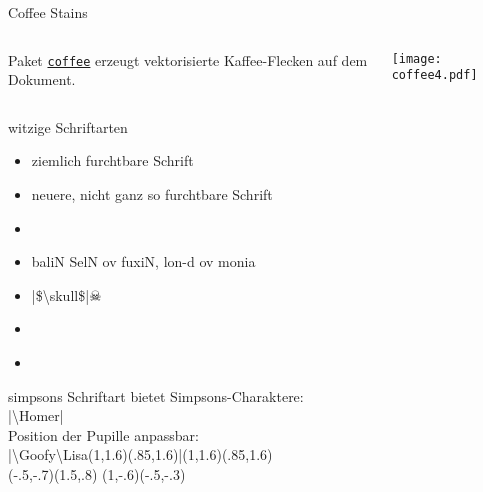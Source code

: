 \documentclass[
	vorläufig=true,
	datum=2016-12-22,
	titel={Witziges und Obskures},
	web=false,
]{../tex/latexkurs-slides}
\begin{document}
\begin{frame}{Coffee Stains}
	\begin{columns}
		\begin{column}{.3\textwidth}
			Paket \alert{\href{http://hanno-rein.de/archives/349}{\texttt{coffee}}} erzeugt vektorisierte Kaffee-Flecken auf dem Dokument.
		\end{column}
		\begin{column}{.6\textwidth}
			\texttt{[image: coffee4.pdf]}
		\end{column}
	\end{columns}
\end{frame}



\begin{frame}{witzige Schriftarten}
	\begin{itemize}[<+->]
		\item {}\hfill{ ziemlich furchtbare Schrift}
		\item {}\hfill{\comicneue neuere, nicht ganz so furchtbare Schrift}
		\item {}%
		\item {}\hfill{\cirth baliN SelN ov fuxiN, lon-d ov monia}
		\vspace{.2ex}

		\item {}\hfill{|\$\textbackslash skull\$|\quad\Large$\skull$}
		\item {}\hfill{\Large{}}
		\vspace{-.8em}

		\item {}\hfill\scalebox{.6}{\dancers Sher­lock Holmes}\hspace{-2ex}\,
	\end{itemize}
\end{frame}

\begin{frame}{simpsons}
Schriftart  bietet Simpsons-Charaktere:\\[-.5em]
|\textbackslash Homer| \hfill\Homer{} \\[2em]\pause\pause
Position der Pupille anpassbar:\\[-.5em]
|\textbackslash Goofy\textbackslash Lisa(1,1.6)(.85,1.6)|\hfill\Goofy\Lisa(1,1.6)(.85,1.6) \\[2em]
\pause
\hfill \Goofy\Marge(-.5,-.7)(1.5,.8) \Goofy\Maggie(1,-.6)(-.5,-.3) \quad \Left\Burns\hfill\,
\end{frame}
\end{document}
